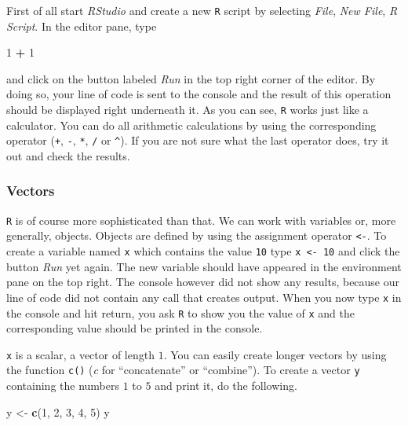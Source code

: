 \documentclass[]{book}
\newenvironment{Shaded}{\begin{snugshade}}{\end{snugshade}}
\newcommand{\KeywordTok}[1]{\textcolor[rgb]{0.13,0.29,0.53}{\textbf{#1}}}
\newcommand{\DecValTok}[1]{\textcolor[rgb]{0.00,0.00,0.81}{#1}}
\newcommand{\StringTok}[1]{\textcolor[rgb]{0.31,0.60,0.02}{#1}}
\newcommand{\OperatorTok}[1]{\textcolor[rgb]{0.81,0.36,0.00}{\textbf{#1}}}
\newcommand{\NormalTok}[1]{#1}
\theoremstyle{definition}
\theoremstyle{definition}
\theoremstyle{definition}
\theoremstyle{remark}
\begin{document}
First of all start \emph{RStudio} and create a new \texttt{R} script by
selecting \emph{File}, \emph{New File}, \emph{R Script}. In the editor
pane, type

\begin{Shaded}
\begin{Highlighting}[]
\DecValTok{1} \OperatorTok{+}\StringTok{ }\DecValTok{1}
\end{Highlighting}
\end{Shaded}

and click on the button labeled \emph{Run} in the top right corner of
the editor. By doing so, your line of code is sent to the console and
the result of this operation should be displayed right underneath it. As
you can see, \texttt{R} works just like a calculator. You can do all
arithmetic calculations by using the corresponding operator (\texttt{+},
\texttt{-}, \texttt{*}, \texttt{/} or \texttt{\textasciicircum{}}). If
you are not sure what the last operator does, try it out and check the
results.

\subsubsection*{Vectors}\label{vectors}

\texttt{R} is of course more sophisticated than that. We can work with
variables or, more generally, objects. Objects are defined by using the
assignment operator \texttt{<-}. To create a variable named \texttt{x}
which contains the value \texttt{10} type \texttt{x\ \textless{}-\ 10}
and click the button \emph{Run} yet again. The new variable should have
appeared in the environment pane on the top right. The console however
did not show any results, because our line of code did not contain any
call that creates output. When you now type \texttt{x} in the console
and hit return, you ask \texttt{R} to show you the value of \texttt{x}
and the corresponding value should be printed in the console.

\texttt{x} is a scalar, a vector of length \(1\). You can easily create
longer vectors by using the function \texttt{c()} (\emph{c} for
``concatenate'' or ``combine''). To create a vector \texttt{y}
containing the numbers \(1\) to \(5\) and print it, do the following.

\begin{Shaded}
\begin{Highlighting}[]
\NormalTok{y <-}\StringTok{ }\KeywordTok{c}\NormalTok{(}\DecValTok{1}\NormalTok{, }\DecValTok{2}\NormalTok{, }\DecValTok{3}\NormalTok{, }\DecValTok{4}\NormalTok{, }\DecValTok{5}\NormalTok{)}
\NormalTok{y}
\end{Highlighting}
\end{Shaded}
\end{document}
